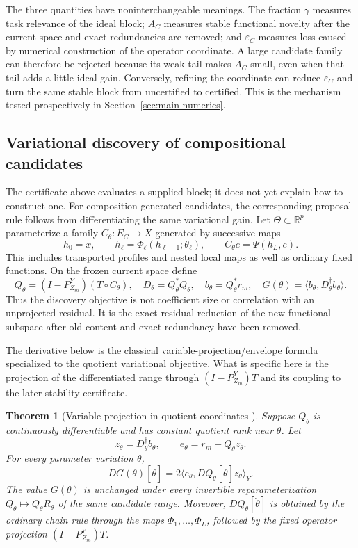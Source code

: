 \documentclass[11pt]{article}
\newtheorem{theorem}{Theorem}[section]
\numberwithin{algorithm}{section}
\theoremstyle{definition}\newtheorem{definition}[theorem]{Definition}
\theoremstyle{remark}\newtheorem{remark}[theorem]{Remark}
\newcommand{\R}{\mathbb R}
\begin{document}
The three quantities have noninterchangeable meanings.  The fraction
$\gamma$ measures task relevance of the ideal block; $A_C$ measures stable
functional novelty after the current space and exact redundancies are
removed; and $\varepsilon_C$ measures loss caused by numerical construction
of the operator coordinate.  A large candidate family can therefore be rejected
because its weak tail makes $A_C$ small, even when that tail adds a little
ideal gain.  Conversely, refining the coordinate can reduce
$\varepsilon_C$ and turn the same stable block from uncertified to certified.
This is the mechanism tested prospectively in Section~\ref{sec:main-numerics}.

\subsection{Variational discovery of compositional candidates}
The certificate above evaluates a supplied block; it does not yet explain how
to construct one.  For composition-generated candidates, the corresponding
proposal rule follows from differentiating the same variational gain.  Let
$\Theta\subset\R^p$ parameterize a
family $C_\theta:E_C\to X$ generated by successive maps
\[
 h_0=x,\qquad h_\ell=\Phi_\ell(h_{\ell-1};\theta_\ell),
 \qquad C_\theta e=\Psi(h_L,e).
\]
This includes transported profiles and nested local maps as well as ordinary
fixed functions.  On the frozen current space define
\[
 Q_\theta=(I-P_{Z_m}^Y)(T\circ C_\theta),\quad
 D_\theta=Q_\theta^*Q_\theta,\quad
 b_\theta=Q_\theta^*r_m,\quad
 G(\theta)=\langle b_\theta,D_\theta^\dagger b_\theta\rangle.
\]
Thus the discovery objective is not coefficient size or correlation with an
unprojected residual.  It is the exact residual reduction of the new
functional subspace after old content and exact redundancy have been removed.

The derivative below is the classical variable-projection/envelope formula
\cite{golubpereyra1973} specialized to the quotient variational objective.
What is specific here is the projection of the differentiated range through
$(I-P_{Z_m}^Y)T$ and its coupling to the later stability certificate.

\begin{theorem}[Variable projection in quotient
  coordinates {\cite{golubpereyra1973}}]
\label{thm:compositional-gain-calculus}
Suppose $Q_\theta$ is continuously differentiable and has constant quotient
rank near $\theta$.  Let
\[
 z_\theta=D_\theta^\dagger b_\theta,\qquad
 e_\theta=r_m-Q_\theta z_\theta.
\]
For every parameter variation $\dot\theta$,
\begin{equation}
 DG(\theta)[\dot\theta]
 =2\langle e_\theta,
          DQ_\theta[\dot\theta]z_\theta\rangle_Y.
 \label{eq:compositional-gain-gradient}
\end{equation}
The value $G(\theta)$ is unchanged under every invertible reparameterization
$Q_\theta\mapsto Q_\theta R_\theta$ of the same candidate range.  Moreover,
$DQ_\theta[\dot\theta]$ is obtained by the ordinary chain rule through the
maps $\Phi_1,\ldots,\Phi_L$, followed by the fixed operator projection
$(I-P_{Z_m}^Y)T$.
\end{theorem}
\end{document}
